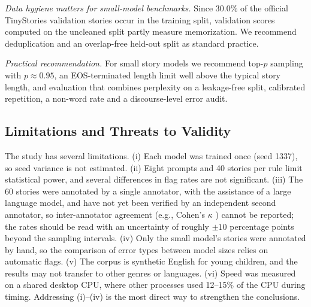 \documentclass[journal]{IEEEtran}
\begin{document}
\emph{Data hygiene matters for small-model benchmarks.} Since 30.0\% of the official TinyStories validation stories occur in the training split, validation scores computed on the uncleaned split partly measure memorization. We recommend deduplication and an overlap-free held-out split as standard practice.

\emph{Practical recommendation.} For small story models we recommend top-$p$ sampling with $p\approx0.95$, an EOS-terminated length limit well above the typical story length, and evaluation that combines perplexity on a leakage-free split, calibrated repetition, a non-word rate and a discourse-level error audit.

\subsection{Limitations and Threats to Validity}
The study has several limitations. (i) Each model was trained once (seed 1337), so seed variance is not estimated. (ii) Eight prompts and 40 stories per rule limit statistical power, and several differences in flag rates are not significant. (iii) The 60 stories were annotated by a single annotator, with the assistance of a large language model, and have not yet been verified by an independent second annotator, so inter-annotator agreement (e.g., Cohen's $\kappa$ \cite{cohen1960kappa}) cannot be reported; the rates should be read with an uncertainty of roughly $\pm10$ percentage points beyond the sampling intervals. (iv) Only the small model's stories were annotated by hand, so the comparison of error types between model sizes relies on automatic flags. (v) The corpus is synthetic English for young children, and the results may not transfer to other genres or languages. (vi) Speed was measured on a shared desktop CPU, where other processes used 12--15\% of the CPU during timing. Addressing (i)--(iv) is the most direct way to strengthen the conclusions.

\end{document}
